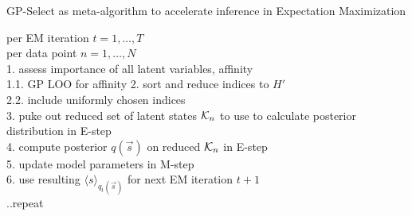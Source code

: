 \begin{algorithm}
\caption{GP-Select as meta-algorithm to accelerate inference in Expectation Maximization}
\label{alg:gp-select}
per EM iteration $t=1,\dots,T$\\
per data point $n=1,\dots, N$\\
1. assess importance of all latent variables, affinity\\
    1.1. GP LOO for affinity
2. sort and reduce indices to $H'$\\
    2.2. include uniformly chosen indices\\
3. puke out reduced set of latent states $\mathcal{K}_{n}$ to use to calculate posterior distribution in E-step\\
4. compute posterior $q(\vec{s})$ on reduced $\mathcal{K}_{n}$ in E-step\\
5. update model parameters in M-step\\ 
6. use resulting $\langle s \rangle_{q_{t}(\vec{s})}$ for next EM iteration $t+1$\\
..repeat
\end{algorithm}

